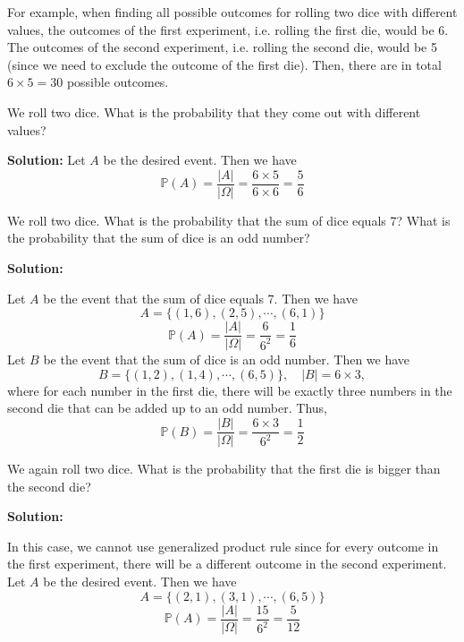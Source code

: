 For example, when finding all possible outcomes for rolling two dice with different values, the outcomes of the first experiment, i.e. rolling the first die, would be 6. The outcomes of the second experiment, i.e. rolling the second die, would be 5 (since we need to exclude the outcome of the first die). Then, there are in total \(6 \times 5 = 30\) possible outcomes. 

\begin{eg}
    We roll two dice. What is the probability that they come out with different values?
    
    \textbf{Solution:}
    Let \(A\) be the desired event. Then we have
    \[
        \mathbb{P}(A) = \dfrac{\vert A \vert}{\vert \Omega \vert} = \dfrac{6 \times 5}{6 \times 6} = \dfrac{5}{6}
    \]
\end{eg}

\begin{eg}
    We roll two dice. What is the probability that the sum of dice equals 7? What is the probability that the sum of dice is an odd number?

    \textbf{Solution: }

    Let \(A\) be the event that the sum of dice equals 7. Then we have
    \[
        A = \{(1, 6), (2, 5), \cdots, (6, 1)\}
    \]
    \[
        \mathbb{P}(A) = \dfrac{\vert A \vert }{\vert \Omega \vert } = \dfrac{6}{6^2} = \dfrac{1}{6}
    \]
    Let \(B\) be the event that the sum of dice is an odd number. Then we have
    \[
        B = \{(1, 2), (1, 4), \cdots, (6, 5)\},\quad \vert B \vert = 6 \times 3,
    \]
    where for each number in the first die, there will be exactly three numbers in the second die that can be added up to an odd number. Thus,
    \[
        \mathbb{P}(B) = \dfrac{\vert B \vert }{\vert \Omega \vert } = \dfrac{6 \times 3}{6^2} = \dfrac{1}{2}
    \]
\end{eg}

\begin{eg}
    We again roll two dice. What is the probability that the first die is bigger than the second die?

    \textbf{Solution: }

    In this case, we cannot use generalized product rule since for every outcome in the first experiment, there will be a different outcome in the second experiment. Let \(A\) be the desired event. Then we have 
    \[
        A = \{(2, 1), (3, 1), \cdots, (6, 5)\}
    \]
    \[
        \mathbb{P}(A) = \dfrac{\vert A \vert }{\vert \Omega \vert } = \dfrac{15}{6^2} = \dfrac{5}{12}
    \]
\end{eg}

